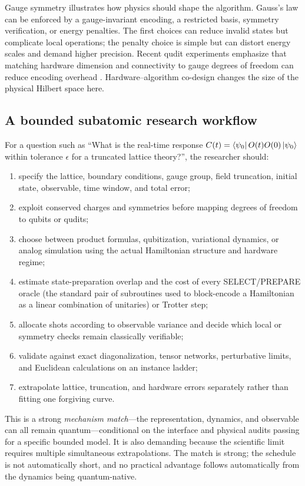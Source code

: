 Gauge symmetry illustrates how physics should shape the algorithm. Gauss's law can be enforced by a gauge-invariant encoding, a restricted basis, symmetry verification, or energy penalties. The first choices can reduce invalid states but complicate local operations; the penalty choice is simple but can distort energy scales and demand higher precision. Recent qudit experiments emphasize that matching hardware dimension and connectivity to gauge degrees of freedom can reduce encoding overhead \citep{meth2025}. Hardware--algorithm co-design changes the size of the physical Hilbert space here.

\subsection{A bounded subatomic research workflow}

For a question such as ``What is the real-time response $C(t)=\left\langle\psi_0\right|O(t)O(0)\left|\psi_0\right\rangle$ within tolerance $\epsilon$ for a truncated lattice theory?'', the researcher should:

\begin{enumerate}
  \item specify the lattice, boundary conditions, gauge group, field truncation, initial state, observable, time window, and total error;
  \item exploit conserved charges and symmetries before mapping degrees of freedom to qubits or qudits;
  \item choose between product formulas, qubitization, variational dynamics, or analog simulation using the actual Hamiltonian structure and hardware regime;
  \item estimate state-preparation overlap and the cost of every SELECT/PREPARE oracle (the standard pair of subroutines used to block-encode a Hamiltonian as a linear combination of unitaries) or Trotter step;
  \item allocate shots according to observable variance and decide which local or symmetry checks remain classically verifiable;
  \item validate against exact diagonalization, tensor networks, perturbative limits, and Euclidean calculations on an instance ladder;
  \item extrapolate lattice, truncation, and hardware errors separately rather than fitting one forgiving curve.
\end{enumerate}

This is a strong \emph{mechanism match}---the representation, dynamics, and observable can all remain quantum---conditional on the interface and physical audits passing for a specific bounded model. It is also demanding because the scientific limit requires multiple simultaneous extrapolations. The match is strong; the schedule is not automatically short, and no practical advantage follows automatically from the dynamics being quantum-native.

